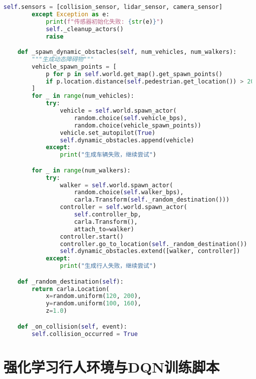 \begin{lstlisting}[language=Python]
            self.sensors = [collision_sensor, lidar_sensor, camera_sensor]
        except Exception as e:
            print(f"传感器初始化失败: {str(e)}")
            self._cleanup_actors()
            raise

    def _spawn_dynamic_obstacles(self, num_vehicles, num_walkers):
        """生成动态障碍物"""
        vehicle_spawn_points = [
            p for p in self.world.get_map().get_spawn_points()
            if p.location.distance(self.pedestrian.get_location()) > 20.0
        ]
        for _ in range(num_vehicles):
            try:
                vehicle = self.world.spawn_actor(
                    random.choice(self.vehicle_bps),
                    random.choice(vehicle_spawn_points))
                vehicle.set_autopilot(True)
                self.dynamic_obstacles.append(vehicle)
            except:
                print("生成车辆失败，继续尝试")

        for _ in range(num_walkers):
            try:
                walker = self.world.spawn_actor(
                    random.choice(self.walker_bps),
                    carla.Transform(self._random_destination()))
                controller = self.world.spawn_actor(
                    self.controller_bp,
                    carla.Transform(),
                    attach_to=walker)
                controller.start()
                controller.go_to_location(self._random_destination())
                self.dynamic_obstacles.extend([walker, controller])
            except:
                print("生成行人失败，继续尝试")

    def _random_destination(self):
        return carla.Location(
            x=random.uniform(120, 200),
            y=random.uniform(100, 160),
            z=1.0)

    def _on_collision(self, event):
        self.collision_occurred = True

\end{lstlisting}

\section{强化学习行人环境与DQN训练脚本}

